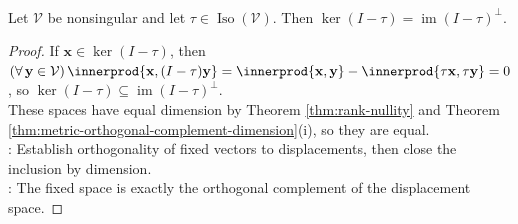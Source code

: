 \begin{proposition} \label{prop:isometry-fixed-space} \\
Let $\mathcal{V}$ be nonsingular and let $\tau\in\operatorname{Iso}(\mathcal{V})$. Then $\ker(I-\tau)=\operatorname{im}(I-\tau)^{\perp}$.
\begin{proof}
If $\mathbf{x}\in\ker(I-\tau)$, then $(\forall\,\mathbf{y}\in\mathcal{V})\,\innerprod{\mathbf{x},(I-\tau)\mathbf{y}}=\innerprod{\mathbf{x},\mathbf{y}}-\innerprod{\tau\mathbf{x},\tau\mathbf{y}}=0$, so $\ker(I-\tau)\subseteq\operatorname{im}(I-\tau)^{\perp}$.\\
These spaces have equal dimension by Theorem \ref{thm:rank-nullity} and Theorem \ref{thm:metric-orthogonal-complement-dimension}(i), so they are equal.\\
: Establish orthogonality of fixed vectors to displacements, then close the inclusion by dimension.\\
: The fixed space is exactly the orthogonal complement of the displacement space.
\end{proof}
\end{proposition}

